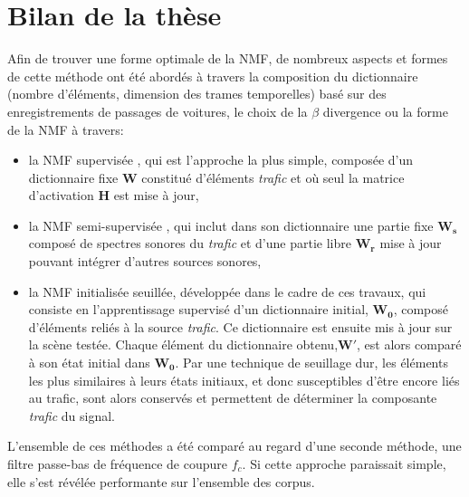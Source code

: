 \section*{Bilan de la thèse}
Afin de trouver une forme optimale de la NMF, de nombreux aspects et formes de cette méthode ont été abordés  à travers la composition du dictionnaire (nombre d'éléments, dimension des trames temporelles) basé sur des enregistrements de passages de voitures, le choix de la $\beta$ divergence ou la forme de la NMF à travers: 
\begin{itemize}
\item la NMF supervisée \cite{lee_learning_1999,fevotte_algorithms_2011}, qui est l'approche la plus simple, composée d'un dictionnaire fixe $ \mathbf{W}$ constitué d'éléments \textit{trafic} et où seul la matrice d'activation $\mathbf{H}$ est mise à jour, 
\item la NMF semi-supervisée \cite{lee_semi-supervised_2010,kitamura2014music}, qui inclut dans son  dictionnaire une partie fixe $\mathbf{W_s}$ composé de spectres sonores du \textit{trafic} et d'une partie libre $\mathbf{W_r}$ mise à jour pouvant intégrer d'autres sources sonores,
\item la NMF initialisée seuillée, développée dans le cadre de ces travaux, qui consiste en l'apprentissage supervisé d'un dictionnaire initial, $\mathbf{W_0}$, composé d'éléments reliés à la source \textit{trafic}. Ce dictionnaire est ensuite mis à jour sur la scène testée. Chaque élément du dictionnaire obtenu,$\mathbf{W'}$, est alors comparé à son état initial dans $\mathbf{W_0}$. Par une technique de seuillage dur, les éléments les plus similaires à leurs états initiaux, et donc susceptibles d'être encore liés au trafic, sont alors conservés et permettent de déterminer la composante \textit{trafic} du signal. 
\end{itemize} 

L'ensemble de ces méthodes a été comparé au regard d'une seconde méthode, une filtre passe-bas de fréquence de coupure $f_c$. Si cette approche paraissait simple, elle s'est révélée performante sur l'ensemble des corpus.\\

